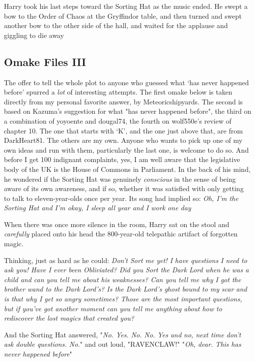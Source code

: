 Harry took his last steps toward the Sorting Hat as the music ended. He swept a
bow to the Order of Chaos at the Gryffindor table, and then turned and swept
another bow to the other side of the hall, and waited for the applause and
giggling to die away{\el}
\sbreak
\subsection{Omake Files III}
The offer to tell the whole plot to anyone who guessed what `has never happened
before' spurred a \emph{lot} of interesting attempts. The first omake below is
taken directly from my personal favorite answer, by Meteoricshipyards. The
second is based on Kazuma's suggestion for what "has never happened before",
the third on a combination of yoyoente and dougal74, the fourth on wolf550e's
review of chapter 10. The one that starts with `K', and the one just above
that, are from DarkHeart81. The others are my own. Anyone who wants to pick up
one of my own ideas and run with them, particularly the last one, is welcome to
do so. And before I get 100 indignant complaints, yes, I am well aware that the
legislative body of the UK is the House of Commons in Parliament.
\sbreak
{\el} In the back of his mind, he wondered if the Sorting Hat was genuinely
\emph{conscious} in the sense of being aware of its own awareness, and if so,
whether it was satisfied with only getting to talk to eleven-year-olds once per
year. Its song had implied so: \emph{Oh, I'm the Sorting Hat and I'm okay, I
sleep all year and I work one day{\el}}

When there was once more silence in the room, Harry sat on the stool and
\emph{carefully} placed onto his head the 800-year-old telepathic artifact of
forgotten magic.

Thinking, just as hard as he could: \emph{Don't Sort me yet! I have questions I
need to ask you! Have I ever been Obliviated? Did you Sort the Dark Lord when
he was a child and can you tell me about his weaknesses? Can you tell me why I
got the brother wand to the Dark Lord's? Is the Dark Lord's ghost bound to my
scar and is that why I get so angry sometimes? Those are the most important
questions, but if you've got another moment can you tell me anything about how
to rediscover the lost magics that created you?}

And the Sorting Hat answered, "\emph{No. Yes. No. No. Yes and no, next time
don't ask double questions. No.}" and out loud, "RAVENCLAW!"
\sbreak
"\emph{Oh, dear. This has never happened before{\el}}"

